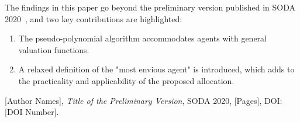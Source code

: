\documentclass{article}
\begin{document}
The findings in this paper go beyond the preliminary version published in SODA 2020~\cite{doi:10.1137/20M1359134}, and two key contributions are highlighted:

\begin{enumerate}
    \item The pseudo-polynomial algorithm accommodates agents with general valuation functions.
    \item A relaxed definition of the "most envious agent" is introduced, which adds to the practicality and applicability of the proposed allocation.
\end{enumerate}

\begin{thebibliography}{9}
    [Author Names],
    \emph{Title of the Preliminary Version},
    SODA 2020, [Pages],
    DOI: [DOI Number].
\end{thebibliography}
\end{document}
